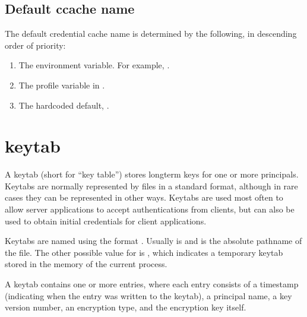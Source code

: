\documentclass[letterpaper,10pt,english]{sphinxmanual}
\begin{document}
\section{Default ccache name}
\label{\detokenize{basic/ccache_def:default-ccache-name}}
\sphinxAtStartPar
The default credential cache name is determined by the following, in
descending order of priority:
\begin{enumerate}
%
\item {} 
\sphinxAtStartPar
The  environment variable.  For example,
.

\item {} 
\sphinxAtStartPar
The  profile variable in .

\item {} 
\sphinxAtStartPar
The hardcoded default, .

\end{enumerate}

\sphinxstepscope


\chapter{keytab}
\label{\detokenize{basic/keytab_def:keytab}}\label{\detokenize{basic/keytab_def:keytab-definition}}\label{\detokenize{basic/keytab_def::doc}}
\sphinxAtStartPar
A keytab (short for “key table”) stores long\sphinxhyphen{}term keys for one or more
principals.  Keytabs are normally represented by files in a standard
format, although in rare cases they can be represented in other ways.
Keytabs are used most often to allow server applications to accept
authentications from clients, but can also be used to obtain initial
credentials for client applications.

\sphinxAtStartPar
Keytabs are named using the format \sphinxcode{\sphinxupquote{:}}.  Usually
 is  and  is the absolute pathname of the file.
The other possible value for  is , which indicates a
temporary keytab stored in the memory of the current process.

\sphinxAtStartPar
A keytab contains one or more entries, where each entry consists of a
timestamp (indicating when the entry was written to the keytab), a
principal name, a key version number, an encryption type, and the
encryption key itself.
\end{document}

